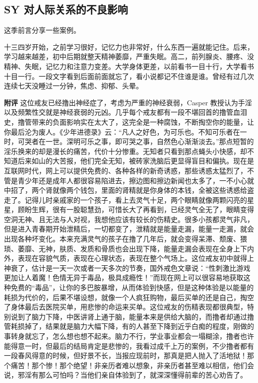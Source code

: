 \subsection{SY 对人际关系的不良影响}

这季前言分享一些案例。

\begin{case}
    十三四岁开始，之前学习很好，记忆力也非常好，什么东西一遍就能记住。后来，学习越来越差，初中后期就整天精神萎靡，严重失眠。高二，前列腺炎、腰疼、没精神、失眠，记忆力和注意力变差。大学身体更差，以前看书一目十行，大学看书十目一行。一段文字看到后面前面就忘了，看小说都记不住谁是谁。曾经有过几次连续七天没睡过一分钟，焦虑、抑郁、头晕。

    \textbf{附评} 这位戒友已经撸出神经症了，考虑为严重的神经衰弱，Casper 教授认为手淫以及频繁性交就是神经衰弱的元凶。几乎每个戒友都有一段不堪回首的撸管血泪史，撸管带来的负面影响实在太大了，这完全是一种腐蚀，不断掏空你的能量，让你最后沦为废人。《少年进德录》云：“凡人之好色，为可乐也。不知可乐者在一时，可哭者在一世。深明可乐之事，即可哭之事，自然色心渐渐淡去。”那点短暂的淫乐换来的却是漫长的痛苦，代价十分惨重。无知者只看到那点蝇头小快感，却不知道后来如山的大苦报，他们完全无知，被砖家洗脑后更显得盲目和偏执。现在是互联网时代，网上可以提供免费的、各种各样的新奇诱惑，那些诱惑太猛烈了，不管是青少年还是成年人都很容易陷进去，擦边图和擦边新闻也太多了，一不小心就中招了，两个肾就像两个钱包，里面的肾精就是你身体的本钱，全被这些诱惑给盗走了。记得儿时亲戚家的一个孩子，看上去灵气十足，两个眼睛就像两颗闪亮的星星，顾盼生辉，很有一股聪慧劲，可惜长大了再看到，已经灵气全无了，眼睛变得空洞无神、且无法与人对视，我想他应该有较长的伤精史。很多小孩都灵气非凡，但是进入青春期开始泄精后，一切都变了，泄精就是能量走漏，能量一走漏，就会出现各种坏变化。本来充满灵气的孩子在撸了几年后，就会变得呆滞、颓废、猥琐、萎靡、无神，肤质、发质和骨质也会出现下降，能量走漏会表现在全身上下内外，表现在容貌气质，表现在心理状态，表现在整个气场上。这位戒友初中就得上神衰了，估计是一天一次或者一天多次的节奏，国外戒色文章说：“性刺激比游戏更加让人着魔！色情无异于毒品，极具成瘾性！”而现在网上可以很容易地获取这种免费的“毒品”，让你的多巴胺暴增，从而体验到快感，但是这种体验是以能量的耗损为代价的，后果不堪设想，就像一个人疯狂购物，最后买单的还是自己，掏空了身体最后去医院买单，用悲惨的命运来买单。这位戒友的伤精表现都很典型，特别说到了脑力下降，中医讲肾上通于脑，能量本来是供给大脑的，而撸者却通过撸管耗损掉了，结果就是脑力大幅下降，有的人甚至下降到近乎白痴的程度，刚做的事转身就忘了，怎么想也想不起来。脑力不行，学业事业都会一塌糊涂，撸者也许能得意一时，但最后的结局肯定是悲惨的，我看过成千上万的案例，不少撸者都有一段春风得意的时候，但好景不长，当报应现前时，那真是把人抛入了活地狱！那个痛苦！那个惨！那个绝望！非亲历者难以想象，非亲历者甚至难以相信，他们会说，邪淫有那么可怕吗？当他们亲自体验到了，就深深懂得前辈的苦心劝告了。
\end{case}

